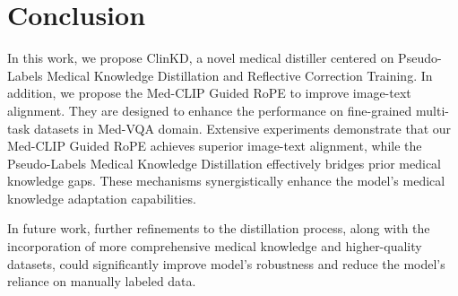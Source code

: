 \section{Conclusion}
In this work, we propose ClinKD, a novel medical distiller centered on Pseudo-Labels Medical Knowledge Distillation and Reflective Correction Training. In addition, we propose the Med-CLIP Guided RoPE to improve image-text alignment. They are designed to enhance the performance on fine-grained multi-task datasets in Med-VQA domain. Extensive experiments demonstrate that our Med-CLIP Guided RoPE achieves superior image-text alignment, while the Pseudo-Labels Medical Knowledge Distillation effectively bridges prior medical knowledge gaps. These mechanisms synergistically enhance the model's medical knowledge adaptation capabilities. 

In future work, further refinements to the distillation process, along with the incorporation of more comprehensive medical knowledge and higher-quality datasets, could significantly improve model's robustness and reduce the model's reliance on manually labeled data.